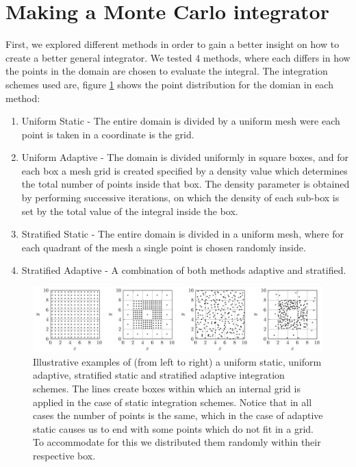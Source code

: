 \section{Making a Monte Carlo integrator}


First, we explored different methods
in order to gain a better insight on how to create a better general integrator. We tested 4 methods, where each differs in how
the points in the domain are chosen to evaluate the integral.
The integration schemes \cite{MCmethods} used are, figure \ref{BoxPlotter} shows
the point distribution for the domian in each method:
\begin{enumerate}
  \item Uniform Static - The entire domain is divided by a uniform mesh were each point is taken in a coordinate is the grid.
  \item Uniform Adaptive - The domain is divided uniformly in square boxes, and for each box a mesh grid is created
  specified by a density value which determines the total number of points inside that box. The density parameter
  is obtained by performing successive iterations, on which the density of each sub-box is set by the total value of the integral inside
  the box.
  \item Stratified Static - The entire domain is divided in a uniform mesh, where for each quadrant of the mesh
  a single point is chosen randomly inside.
  \item Stratified Adaptive - A combination of both methods adaptive and stratified.
\end{enumerate}
\begin{figure}
  \begin{center}
    \includegraphics[scale=1 ]{graphs/BoxPlotter.pdf}
  \caption{Illustrative examples of (from left to right) a uniform static, uniform adaptive, stratified static and stratified adaptive integration schemes. The lines create boxes within which an internal grid is applied in the case of static integration schemes. Notice that in all cases the number of points is the same, which in the case of adaptive static causes us to end with some points which do not fit in a grid. To accommodate for this we distributed them randomly within their respective box. }
\label{BoxPlotter}
  \end{center}
\end{figure}

